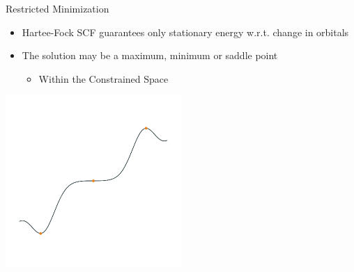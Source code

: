\documentclass[10pt]{beamer}
\begin{document}
{{%


\begin{frame}[fragile]{Restricted Minimization}
	\begin{itemize}
		\item<1-> Hartee-Fock SCF guarantees only stationary energy w.r.t. change in orbitals
		\item<1-> The solution may be a maximum, minimum or saddle point 
		\begin{itemize}
			\item<2->[] \begin{alertblock}{Within the Constrained Space} \end{alertblock}
		\end{itemize}
	\end{itemize}
	\begin{center}
		\includegraphics[width=0.5\textwidth]{../../images/1d_extrema.pdf}
	\end{center}
\end{frame}

}}
\end{document}
